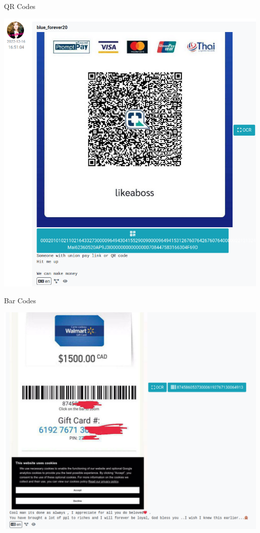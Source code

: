 \documentclass[10pt,aspectratio=169, colorlinks=true, linkcolor=circlBlue]{beamer}
\begin{document}
\begin{frame}[fragile]{QR Codes}
    \begin{center}
        \includegraphics[scale=0.235]{screenshot/qr-pay.png}
    \end{center}
\end{frame}

\begin{frame}[fragile]{Bar Codes}
    \begin{center}
        \includegraphics[scale=0.22]{screenshot/barcode.png}
    \end{center}
\end{frame}
\end{document}
